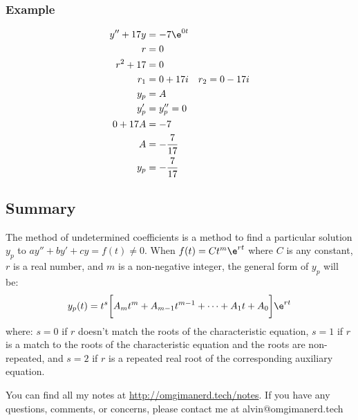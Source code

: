 \documentclass{math}
\begin{document}
\subsubsection*{Example}
\begin{align*}
  y''+17y &= -7\e^{0t} \\
  r &= 0 \\
  r^2+17 &= 0 \\
  r_1 &= 0+17i \quad r_2 = 0-17i \\
  y_p &= A \\
  y_p' &= y_p'' = 0 \\
  0+17A &= -7 \\
  A &= -\frac{7}{17} \\
  y_p &= -\frac{7}{17}
\end{align*}

\subsection*{Summary}
The method of undetermined coefficients is a method to find a particular
solution \( y_p \) to \( ay''+by'+cy = f(t) \ne 0 \). When \( f(t) =
Ct^m\e^{rt} \) where \( C \) is any constant, \( r \) is a real number, and
\( m \) is a non-negative integer, the general form of \( y_p \) will be:
\[ y_p(t) = t^s\bigg[A_mt^m+A_{m-1}t^{m-1}+\dots+A_1t+A_0\bigg]\e^{rt} \]
where:
\( s = 0 \) if \( r \) doesn't match the roots of the characteristic
equation, \( s = 1 \) if \( r \) is a match to the roots of the characteristic
equation and the roots are non-repeated, and \( s = 2 \) if \( r \) is a
repeated real root of the corresponding auxiliary equation.

\begin{center}
  You can find all my notes at \url{http://omgimanerd.tech/notes}. If you have
  any questions, comments, or concerns, please contact me at
  alvin@omgimanerd.tech
\end{center}
\end{document}

